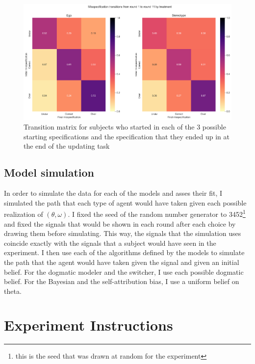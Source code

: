 \documentclass[
  12pt,
]{article}
\begin{document}
\begin{figure}
\hypertarget{fig:transitions-treatment}{%
\centering
\includegraphics{../figures/misspecification_transitions_treatment.png}
\caption{Transition matrix for subjects who started in each of the 3
possible starting specifications and the specification that they ended
up in at the end of the updating task}\label{fig:transitions-treatment}
}
\end{figure}

\hypertarget{model-simulation}{%
\subsection{Model simulation}\label{model-simulation}}

In order to simulate the data for each of the models and asses their
fit, I simulated the path that each type of agent would have taken given
each possible realization of \((\theta, \omega)\). I fixed the seed of
the random number generator to
3452\footnote{this is the seed that was drawn at random for the experiment}
and fixed the signals that would be shown in each round after each
choice by drawing them before simulating. This way, the signals that the
simulation uses coincide exactly with the signals that a subject would
have seen in the experiment. I then use each of the algorithms defined
by the models to simulate the path that the agent would have taken given
the signal and given an initial belief. For the dogmatic modeler and the
switcher, I use each possible dogmatic belief. For the Bayesian and the
self-attribution bias, I use a uniform belief on theta.

\hypertarget{experiment-instructions}{%
\section{Experiment Instructions}\label{experiment-instructions}}
\end{document}
